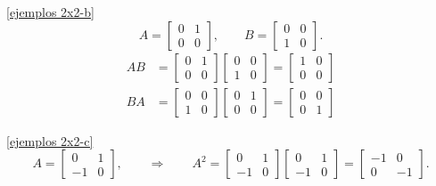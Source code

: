 \begin{enumerate}[topsep=6pt,itemsep=.4cm]
\noindent\ref{ejemplos 2x2-b}
 \begin{equation*}
    A = \begin{bmatrix}
        0 & 1\\ 0 & 0
        \end{bmatrix}, \qquad B = 
        \begin{bmatrix}
        0 & 0\\ 1 & 0
        \end{bmatrix}.
\end{equation*}
\begin{align*}
    AB &= \begin{bmatrix}
        0 & 1\\ 0 & 0
        \end{bmatrix} \begin{bmatrix}
            0 & 0\\ 1 & 0
            \end{bmatrix} = \begin{bmatrix}
                1 & 0\\ 0 & 0
                \end{bmatrix} \\
    BA &=  
        \begin{bmatrix}
        0 & 0\\ 1 & 0
        \end{bmatrix}
        \begin{bmatrix}
        0 & 1\\ 0 & 0
        \end{bmatrix} = \begin{bmatrix}
        0 & 0\\ 0 & 1
        \end{bmatrix} 
\end{align*}

\noindent\ref{ejemplos 2x2-c}
 \begin{equation*}
    A = \begin{bmatrix}
        0 & 1\\ -1 & 0
        \end{bmatrix}, \qquad \Rightarrow \qquad A^2 = 
        \begin{bmatrix}
            0 & 1\\ -1 & 0
            \end{bmatrix}
            \begin{bmatrix}
                0 & 1\\ -1 & 0
                \end{bmatrix}
            = \begin{bmatrix}
                -1 & 0\\ 0 & -1
                \end{bmatrix}.
\end{equation*}


\end{enumerate}
